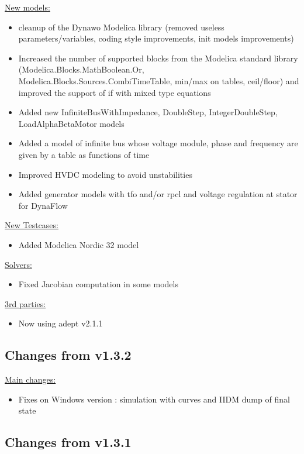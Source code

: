 \documentclass[a4paper, 12pt]{report}
\begin{document}
\underline{New models:}
\begin{itemize}
\item cleanup of the Dynawo Modelica library (removed useless parameters/variables, coding style improvements, init models improvements)
\item Increased the number of supported blocks from the Modelica standard library (Modelica.Blocks.MathBoolean.Or, Modelica.Blocks.Sources.CombiTimeTable, min/max on tables, ceil/floor) and improved the support of if with mixed type equations
\item Added new InfiniteBusWithImpedance, DoubleStep, IntegerDoubleStep, LoadAlphaBetaMotor models
\item Added a model of infinite bus whose voltage module, phase and frequency are given by a table as functions of time
\item Improved HVDC modeling to avoid unstabilities
\item Added generator models with tfo and/or rpcl and voltage regulation at stator for DynaFlow
\end{itemize}

\underline{New Testcases:}\begin{itemize}
\item Added Modelica Nordic 32 model
\end{itemize}

\underline{Solvers:}\begin{itemize}
\item Fixed Jacobian computation in some models
\end{itemize}

\underline{3rd parties:}\begin{itemize}
\item Now using adept v2.1.1
\end{itemize}

\subsection{Changes from v1.3.2}

\underline{Main changes:}
\begin{itemize}
\item Fixes on Windows version : simulation with curves and IIDM dump of final state
\end{itemize}

\subsection{Changes from v1.3.1}
\end{document}
